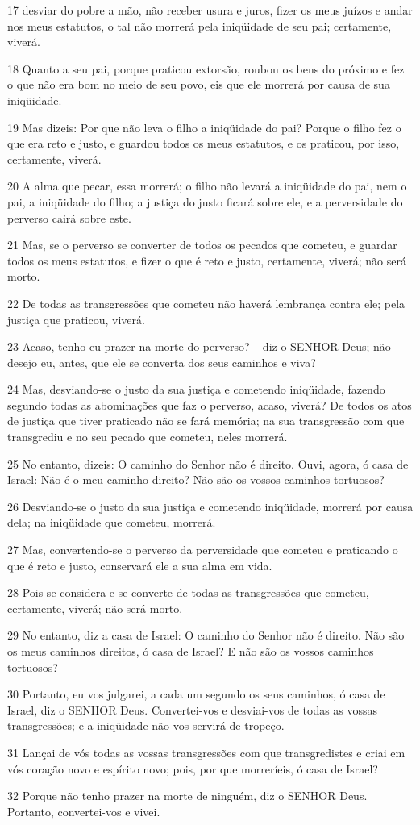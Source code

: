 \par 17 desviar do pobre a mão, não receber usura e juros, fizer os meus juízos e andar nos meus estatutos, o tal não morrerá pela iniqüidade de seu pai; certamente, viverá.
\par 18 Quanto a seu pai, porque praticou extorsão, roubou os bens do próximo e fez o que não era bom no meio de seu povo, eis que ele morrerá por causa de sua iniqüidade.
\par 19 Mas dizeis: Por que não leva o filho a iniqüidade do pai? Porque o filho fez o que era reto e justo, e guardou todos os meus estatutos, e os praticou, por isso, certamente, viverá.
\par 20 A alma que pecar, essa morrerá; o filho não levará a iniqüidade do pai, nem o pai, a iniqüidade do filho; a justiça do justo ficará sobre ele, e a perversidade do perverso cairá sobre este.
\par 21 Mas, se o perverso se converter de todos os pecados que cometeu, e guardar todos os meus estatutos, e fizer o que é reto e justo, certamente, viverá; não será morto.
\par 22 De todas as transgressões que cometeu não haverá lembrança contra ele; pela justiça que praticou, viverá.
\par 23 Acaso, tenho eu prazer na morte do perverso? -- diz o SENHOR Deus; não desejo eu, antes, que ele se converta dos seus caminhos e viva?
\par 24 Mas, desviando-se o justo da sua justiça e cometendo iniqüidade, fazendo segundo todas as abominações que faz o perverso, acaso, viverá? De todos os atos de justiça que tiver praticado não se fará memória; na sua transgressão com que transgrediu e no seu pecado que cometeu, neles morrerá.
\par 25 No entanto, dizeis: O caminho do Senhor não é direito. Ouvi, agora, ó casa de Israel: Não é o meu caminho direito? Não são os vossos caminhos tortuosos?
\par 26 Desviando-se o justo da sua justiça e cometendo iniqüidade, morrerá por causa dela; na iniqüidade que cometeu, morrerá.
\par 27 Mas, convertendo-se o perverso da perversidade que cometeu e praticando o que é reto e justo, conservará ele a sua alma em vida.
\par 28 Pois se considera e se converte de todas as transgressões que cometeu, certamente, viverá; não será morto.
\par 29 No entanto, diz a casa de Israel: O caminho do Senhor não é direito. Não são os meus caminhos direitos, ó casa de Israel? E não são os vossos caminhos tortuosos?
\par 30 Portanto, eu vos julgarei, a cada um segundo os seus caminhos, ó casa de Israel, diz o SENHOR Deus. Convertei-vos e desviai-vos de todas as vossas transgressões; e a iniqüidade não vos servirá de tropeço.
\par 31 Lançai de vós todas as vossas transgressões com que transgredistes e criai em vós coração novo e espírito novo; pois, por que morreríeis, ó casa de Israel?
\par 32 Porque não tenho prazer na morte de ninguém, diz o SENHOR Deus. Portanto, convertei-vos e vivei.

